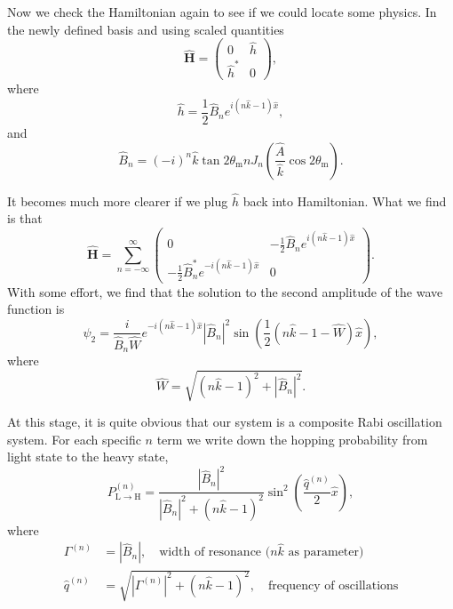 



Now we check the Hamiltonian again to see if we could locate some physics. In the newly defined basis and using scaled quantities
\begin{equation}
   \hat{\mathbf{H}} = \begin{pmatrix}
   0 & \hat h \\
   \hat h^* & 0
   \end{pmatrix},
\end{equation}
where
\begin{equation}
   \hat h = \frac{1}{2} \hat B_n e^{i(n \hat k - 1)\hat x},
\end{equation}
and
\begin{equation}
   \hat B_n = (-i)^n \hat k \tan 2\theta_{\mathrm{m}} n J_n (\frac{\hat A}{\hat k} \cos 2\theta_{\mathrm{m}}).
\end{equation}

It becomes much more clearer if we plug $\hat h$ back into Hamiltonian. What we find is that
\begin{equation}
   \hat{\mathbf{H}} = \sum_{n=-\infty}^{\infty} \begin{pmatrix}
   0 & -\frac{1}{2} \hat B_n e^{i(n \hat k - 1)\hat x} \\
   -\frac{1}{2} \hat B_n^* e^{-i(n \hat k - 1)\hat x} & 0
   \end{pmatrix}.
\end{equation}
With some effort, we find that the solution to the second amplitude of the wave function is
\begin{equation}
   \psi_2 = \frac{i}{ \hat B_n \hat W} e^{-i(n \hat k -1)\hat x}  \left\vert \hat B_n \right\vert^2 \sin\left( \frac{1}{2}(n \hat k -1 -\hat W) \hat x  \right),
\end{equation}
where
\begin{equation}
   \hat W = \sqrt{ (n \hat k - 1)^2 + \left\vert \hat B_n \right\vert^2 }.
\end{equation}


At this stage, it is quite obvious that our system is a composite Rabi oscillation system. For each specific $n$ term we write down the hopping probability from light state to the heavy state,
\begin{equation}
   P_{\mathrm{L}\to\mathrm{H}}^{(n)} = \frac{ \left\lvert \hat B_{n}  \right\rvert^2 }{ \left\lvert   \hat B_{n}  \right\rvert^2 + ( n \hat k - 1 )^2  } \sin^2 \left( \frac{ \hat q^{(n)} }{2} \hat x \right),
\end{equation}
where
\begin{align}
   \Gamma^{(n)} &= \left\lvert \hat B_{n} \right\rvert, \quad \text{width of resonance ($n\hat k$ as parameter)} \\
   \hat q^{(n)} &= \sqrt{\left\lvert  \Gamma^{(n)} \right\rvert^2 + ( n \hat k - 1 )^2},\quad \text{frequency of oscillations}
\end{align}

